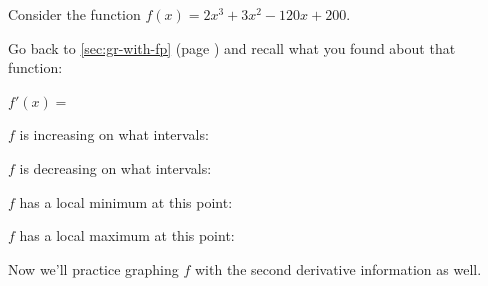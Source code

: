 
Consider the function $f(x) = 2x^3 + 3x^2 - 120x + 200$.

Go back to \cref{sec:gr-with-fp} (page \pageref{sec:gr-with-fp}) and recall what you found about that function:
\begin{ProblemSet}[pencil space=1in]

 \begin{Problem}
  $f'(x) =$
 \end{Problem}
 \begin{Problem}
  $f$ is increasing on what intervals:
 \end{Problem}
 \begin{Problem}
  $f$ is decreasing on what intervals:
 \end{Problem}
 \begin{Problem}
  $f$ has a local minimum at this point:
 \end{Problem}
 \begin{Problem}
  $f$ has a local maximum at this point:
 \end{Problem}
\end{ProblemSet}

\newpage

Now we'll practice graphing $f$ with the second derivative information as well.

